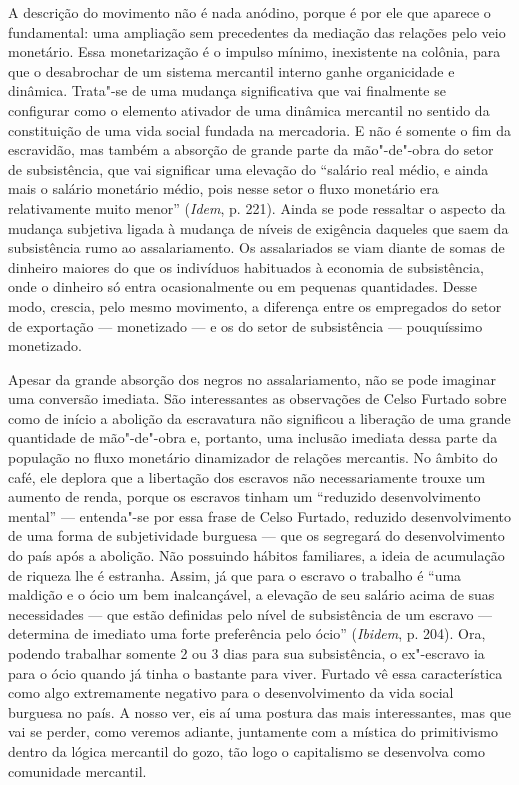 A descrição do movimento não é nada anódino, porque é por ele que
aparece o fundamental: uma ampliação sem precedentes da mediação das
relações pelo veio monetário. Essa monetarização é o impulso mínimo,
inexistente na colônia, para que o desabrochar de um sistema mercantil
interno ganhe organicidade e dinâmica. Trata"-se de uma mudança
significativa que vai finalmente se configurar como o elemento ativador
de uma dinâmica mercantil no sentido da constituição de uma vida social
fundada na mercadoria. E não é somente o fim da escravidão, mas também a
absorção de grande parte da mão"-de"-obra do setor de subsistência, que
vai significar uma elevação do ``salário real médio, e ainda mais o
salário monetário médio, pois nesse setor o fluxo monetário era
relativamente muito menor'' (\emph{Idem}, p. 221). Ainda se pode
ressaltar o aspecto da mudança subjetiva ligada à mudança de níveis de
exigência daqueles que saem da subsistência rumo ao assalariamento. Os
assalariados se viam diante de somas de dinheiro maiores do que os
indivíduos habituados à economia de subsistência, onde o dinheiro só
entra ocasionalmente ou em pequenas quantidades. Desse modo, crescia,
pelo mesmo movimento, a diferença entre os empregados do setor de
exportação --- monetizado --- e os do setor de subsistência --- pouquíssimo
monetizado.

Apesar da grande absorção dos negros no assalariamento, não se pode
imaginar uma conversão imediata. São interessantes as
observações de Celso Furtado sobre como de início a abolição da
escravatura não significou a liberação de uma grande quantidade de
mão"-de"-obra e, portanto, uma inclusão imediata dessa parte da população
no fluxo monetário dinamizador de relações mercantis. No âmbito do café,
ele deplora que a libertação dos escravos não necessariamente trouxe um
aumento de renda, porque os escravos tinham um ``reduzido
desenvolvimento mental'' --- entenda"-se por essa frase de Celso Furtado,
reduzido desenvolvimento de uma forma de subjetividade burguesa --- que
os segregará do desenvolvimento do país após a abolição. Não possuindo
hábitos familiares, a ideia de acumulação de riqueza lhe é estranha.
Assim, já que para o escravo o trabalho é ``uma maldição e o ócio um bem
inalcançável, a elevação de seu salário acima de suas necessidades ---
que estão definidas pelo nível de subsistência de um escravo ---
determina de imediato uma forte preferência pelo ócio'' (\emph{Ibidem},
p. 204). Ora, podendo trabalhar somente 2 ou 3 dias para sua
subsistência, o ex"-escravo ia para o ócio quando já tinha o bastante
para viver. Furtado vê essa característica como algo extremamente
negativo para o desenvolvimento da vida social burguesa no país. A nosso
ver, eis aí uma postura das mais interessantes, mas que vai se perder,
como veremos adiante, juntamente com a mística do primitivismo dentro da
lógica mercantil do gozo, tão logo o capitalismo se desenvolva como
comunidade mercantil.

